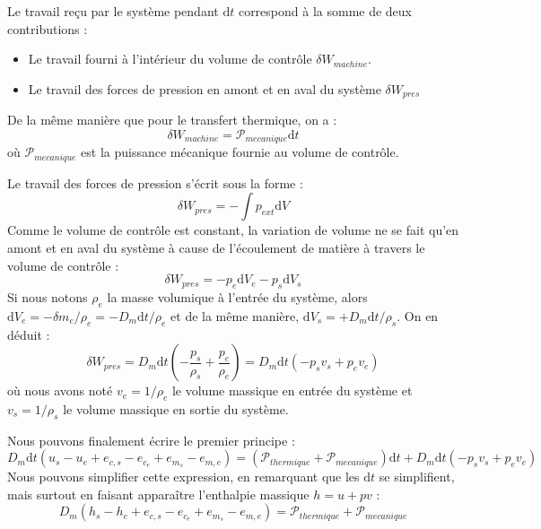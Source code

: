 \documentclass[11pt,fleqn]{book} %
\newcommand{\dd}{\mathrm{d}}
\begin{document}
\begin{solution}
Le travail reçu par le système pendant $\dd t$ correspond à la somme de deux contributions :
\begin{itemize}
    \item Le travail fourni à l'intérieur du volume de contrôle $\delta W_{machine}$.
    \item Le travail des forces de pression en amont et en aval du système $\delta W_{pres}$
\end{itemize}

De la même manière que pour le transfert thermique, on a :
\begin{equation}
    \delta W_{machine} = \mathcal{P}_{mecanique} \dd t
\end{equation}
où $\mathcal{P}_{mecanique}$ est la puissance mécanique fournie au volume de contrôle.

Le travail des forces de pression s'écrit sous la forme :
\begin{equation}
    \delta W_{pres} = - \int p_{ext} \dd V 
\end{equation}
Comme le volume de contrôle est constant, la variation de volume ne se fait qu'en amont et en aval du système à cause de l'écoulement de matière à travers le volume de contrôle :
\begin{equation}
    \delta W_{pres}= - p_e \dd V_e - p_s \dd V_s
\end{equation}
Si nous notons $\rho_e$ la masse volumique à l'entrée du système, alors $\dd V_e = -\delta m_e/\rho_e = -D_m \dd t/\rho_e$ et de la même manière, $\dd V_s = +D_m \dd t/\rho_s$.
On en déduit :
\begin{equation}
    \delta W_{pres} = D_m \dd t \left(-\frac{p_s}{\rho_s} + \frac{p_e}{\rho_e} \right) = D_m \dd t (-p_s v_s + p_e v_e)
\end{equation}
où nous avons noté $v_e = 1/\rho_e$ le volume massique en entrée du système et $v_s = 1/\rho_s$ le volume massique en sortie du système.

Nous pouvons finalement écrire le premier principe :
\begin{equation}
    D_m \dd t ( u_s - u_e + e_{c,s} - e_{c_e} + e_{m_s} - e_{m,e}) = (\mathcal{P}_{thermique} + \mathcal{P}_{mecanique} ) \dd t + D_m \dd t (-p_s v_s + p_e v_e)
\end{equation}
Nous pouvons simplifier cette expression, en remarquant que les $\dd t$ se simplifient, mais surtout en faisant apparaître l'enthalpie massique $h = u + pv$ :
\begin{equation}
    D_m ( h_s - h_e + e_{c,s} - e_{c_e} + e_{m_s} - e_{m,e}) = \mathcal{P}_{thermique} + \mathcal{P}_{mecanique}
\end{equation}
\end{solution}
\end{document}
